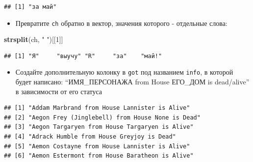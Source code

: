 \documentclass[]{book}
\newenvironment{Shaded}{\begin{snugshade}}{\end{snugshade}}
\newcommand{\KeywordTok}[1]{\textcolor[rgb]{0.13,0.29,0.53}{\textbf{#1}}}
\newcommand{\DecValTok}[1]{\textcolor[rgb]{0.00,0.00,0.81}{#1}}
\newcommand{\StringTok}[1]{\textcolor[rgb]{0.31,0.60,0.02}{#1}}
\newcommand{\OperatorTok}[1]{\textcolor[rgb]{0.81,0.36,0.00}{\textbf{#1}}}
\newcommand{\NormalTok}[1]{#1}
\providecommand{\tightlist}{%
  \setlength{\itemsep}{0pt}\setlength{\parskip}{0pt}}
\begin{document}
\begin{verbatim}
## [1] "за май"
\end{verbatim}

\begin{itemize}
\tightlist
\item
  Превратите \texttt{ch} обратно в вектор, значения которого - отдельные
  слова:
\end{itemize}

\begin{Shaded}
\begin{Highlighting}[]
\KeywordTok{strsplit}\NormalTok{(ch, }\StringTok{" "}\NormalTok{)[[}\DecValTok{1}\NormalTok{]]}
\end{Highlighting}
\end{Shaded}

\begin{verbatim}
## [1] "Я"     "выучу" "R"     "за"    "май!"
\end{verbatim}

\begin{itemize}
\tightlist
\item
  Создайте дополнительную колонку в \texttt{got} под названием
  \texttt{info}, в которой будет написано: ``ИМЯ\_ПЕРСОНАЖА from House
  ЕГО\_ДОМ is dead/alive'' в зависимости от его статуса
\end{itemize}

\begin{Shaded}
\end{Shaded}

\begin{verbatim}
## [1] "Addam Marbrand from House Lannister is Alive"   
## [2] "Aegon Frey (Jinglebell) from House None is Dead"
## [3] "Aegon Targaryen from House Targaryen is Alive"  
## [4] "Adrack Humble from House Greyjoy is Dead"       
## [5] "Aemon Costayne from House Lannister is Alive"   
## [6] "Aemon Estermont from House Baratheon is Alive"
\end{verbatim}
\end{document}
